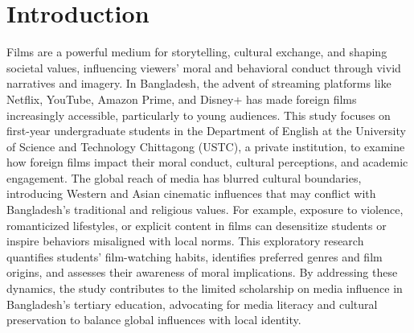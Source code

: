 \documentclass[12pt]{article}
\begin{document}
\section{Introduction}
Films are a powerful medium for storytelling, cultural exchange, and shaping societal values, influencing viewers’ moral and behavioral conduct through vivid narratives and imagery. In Bangladesh, the advent of streaming platforms like Netflix, YouTube, Amazon Prime, and Disney+ has made foreign films increasingly accessible, particularly to young audiences. This study focuses on first-year undergraduate students in the Department of English at the University of Science and Technology Chittagong (USTC), a private institution, to examine how foreign films impact their moral conduct, cultural perceptions, and academic engagement. The global reach of media has blurred cultural boundaries, introducing Western and Asian cinematic influences that may conflict with Bangladesh’s traditional and religious values. For example, exposure to violence, romanticized lifestyles, or explicit content in films can desensitize students or inspire behaviors misaligned with local norms. This exploratory research quantifies students’ film-watching habits, identifies preferred genres and film origins, and assesses their awareness of moral implications. By addressing these dynamics, the study contributes to the limited scholarship on media influence in Bangladesh’s tertiary education, advocating for media literacy and cultural preservation to balance global influences with local identity.

\end{document}
